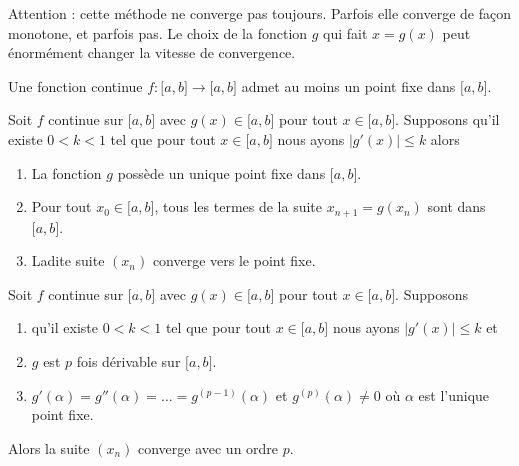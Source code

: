 Attention : cette méthode ne converge pas toujours. Parfois elle converge de façon monotone, et parfois pas. Le choix de la fonction \( g\) qui fait \( x=g(x)\) peut énormément changer la vitesse de convergence.

\begin{theorem}
    Une fonction continue \( f\colon \mathopen[ a , b \mathclose]\to \mathopen[ a , b \mathclose]\) admet au moins un point fixe dans \( \mathopen[ a , b \mathclose]\).
\end{theorem}

\begin{theorem}   
    Soit \( f\) continue sur \( \mathopen[ a , b \mathclose]\) avec \( g(x)\in\mathopen[ a , b \mathclose]\) pour tout \( x\in\mathopen[ a , b \mathclose]\). Supposons qu'il existe \( 0<k<1\) tel que pour tout \( x\in\mathopen[ a , b \mathclose]\) nous ayons \( | g'(x) |\leq k\) alors 
    \begin{enumerate}
        \item
            La fonction \( g\) possède un unique point fixe dans \( \mathopen[ a , b \mathclose]\).
        \item
            Pour tout \( x_0\in\mathopen[ a , b \mathclose]\), tous les termes de la suite \( x_{n+1}=g(x_n)\) sont dans \( \mathopen[ a , b \mathclose]\).
        \item
            Ladite suite \( (x_n)\) converge vers le point fixe.
    \end{enumerate}
\end{theorem}

\begin{theorem}
    Soit \( f\) continue sur \( \mathopen[ a , b \mathclose]\) avec \( g(x)\in\mathopen[ a , b \mathclose]\) pour tout \( x\in\mathopen[ a , b \mathclose]\). Supposons
    \begin{enumerate}
        \item
    qu'il existe \( 0<k<1\) tel que pour tout \( x\in\mathopen[ a , b \mathclose]\) nous ayons \( | g'(x) |\leq k\) et
\item
    \( g\) est \( p\) fois dérivable sur \( \mathopen[ a , b \mathclose]\).
\item
    \( g'(\alpha)=g''(\alpha)=\ldots=g^{(p-1)}(\alpha)\) et \( g^{(p)}(\alpha)\neq 0\) où \( \alpha\) est l'unique point fixe.
    \end{enumerate}
    Alors la suite \( (x_n)\) converge avec un ordre \( p\).
\end{theorem}



